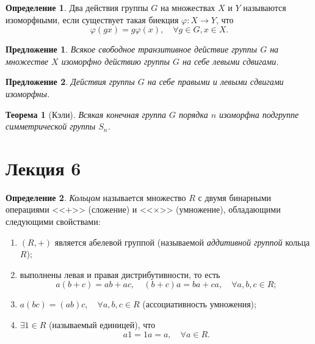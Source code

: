 \documentclass[a4paper]{article}
\theoremstyle{plain}
\newtheorem*{theorem}{Теорема}
\newtheorem{proposal}{Предложение}
\theoremstyle{definition}
\newtheorem{definition}{Определение}
\numberwithin{definition}{section}
\numberwithin{proposal}{section}
\begin{document}
\begin{definition}
Два действия группы \(G\) на множествах \(X\) и \(Y\) называются изоморфными, если существует такая биекция \(\varphi: X \rightarrow Y\), что
\begin{equation*}
	\varphi(gx) = g\varphi(x), \quad \forall g \in G, x \in X.
\end{equation*}
\end{definition}

\begin{proposal}
Всякое свободное транзитивное действие группы \(G\) на множестве \(X\) изоморфно действию группы \(G\) на себе левыми сдвигами.
\end{proposal}

\begin{proposal}
Действия группы \(G\) на себе правыми и левыми сдвигами изоморфны.
\end{proposal}

\begin{theorem}[Кэли]
Всякая конечная группа \(G\) порядка \(n\) изоморфна подгруппе симметрической группы \(S_n\).
\end{theorem}


\section{Лекция 6}

\begin{definition}
\emph{Кольцом} называется множество \(R\) с двумя бинарными операциями <<\(+\)>> (сложение) и <<\(\times\)>> (умножение), обладающими следующими свойствами:
\begin{enumerate}
	\item \((R, +)\) является абелевой группой (называемой \emph{аддитивной группой} кольца \(R\));
	\item выполнены левая и правая дистрибутивности, то есть
	\begin{equation*}
		a(b + c) = ab + ac, \quad (b + c)a = ba + ca, \quad \forall a, b, c \in R;
	\end{equation*}
	\item \(a(bc) = (ab)c, \quad \forall a, b, c \in R\) (ассоциативность умножения);
	\item \(\exists 1 \in R\) (называемый единицей), что
	\begin{equation*}
		a1 = 1a = a, \quad \forall a \in R.
	\end{equation*}
\end{enumerate}
\end{definition}
\end{document}
